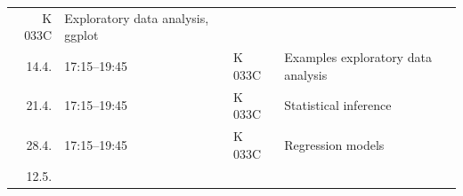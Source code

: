 \documentclass[]{article}
\begin{document}
\begin{longtable}[c]{@{}rlll@{}}
\begin{minipage}[t]{0.13\columnwidth}
K 033C
\strut\end{minipage} &
\begin{minipage}[t]{0.51\columnwidth}\raggedright\strut
Exploratory data analysis, ggplot
\strut\end{minipage}\tabularnewline
\begin{minipage}[t]{0.09\columnwidth}\raggedleft\strut
14.4.
\strut\end{minipage} &
\begin{minipage}[t]{0.15\columnwidth}\raggedright\strut
17:15--19:45
\strut\end{minipage} &
\begin{minipage}[t]{0.13\columnwidth}\raggedright\strut
K 033C
\strut\end{minipage} &
\begin{minipage}[t]{0.51\columnwidth}\raggedright\strut
Examples exploratory data analysis
\strut\end{minipage}\tabularnewline
\begin{minipage}[t]{0.09\columnwidth}\raggedleft\strut
21.4.
\strut\end{minipage} &
\begin{minipage}[t]{0.15\columnwidth}\raggedright\strut
17:15--19:45
\strut\end{minipage} &
\begin{minipage}[t]{0.13\columnwidth}\raggedright\strut
K 033C
\strut\end{minipage} &
\begin{minipage}[t]{0.51\columnwidth}\raggedright\strut
Statistical inference
\strut\end{minipage}\tabularnewline
\begin{minipage}[t]{0.09\columnwidth}\raggedleft\strut
28.4.
\strut\end{minipage} &
\begin{minipage}[t]{0.15\columnwidth}\raggedright\strut
17:15--19:45
\strut\end{minipage} &
\begin{minipage}[t]{0.13\columnwidth}\raggedright\strut
K 033C
\strut\end{minipage} &
\begin{minipage}[t]{0.51\columnwidth}\raggedright\strut
Regression models
\strut\end{minipage}\tabularnewline
\begin{minipage}[t]{0.09\columnwidth}\raggedleft\strut
12.5.
\strut\end{minipage} &
\begin{minipage}[t]{0.15\columnwidth}\raggedright\strut

\end{minipage}
\end{longtable}
\end{document}

